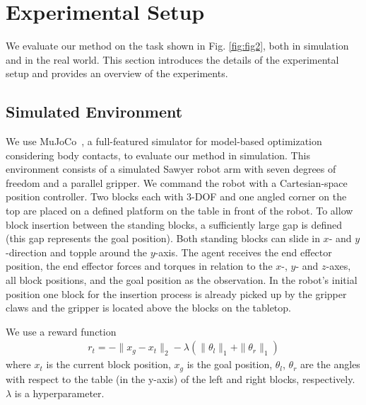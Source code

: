 \section{Experimental Setup}\label{sec:experiments}

We evaluate our method on the task shown in Fig. \ref{fig:fig2}, both in simulation and in the real world. This section introduces the details of the experimental setup and provides an overview of the experiments.

\subsection{Simulated Environment}
We use MuJoCo~\cite{todorov12mujoco}, a full-featured simulator for model-based optimization considering body contacts, to evaluate our method in simulation.
This environment consists of a simulated Sawyer robot arm with seven degrees of freedom and a parallel gripper. 
We command the robot with a Cartesian-space position controller.
Two blocks each with 3-DOF and one angled corner on the top are placed on a defined platform on the table in front of the robot. 
To allow block insertion between the standing blocks, a sufficiently large gap is defined (this gap represents the goal position). 
Both standing blocks can slide in $x$- and $y$-direction and topple around the $y$-axis.
The agent receives the end effector position, the end effector forces and torques in relation to the $x$-, $y$- and $z$-axes, all block positions, and the goal position as the observation. In the robot's initial position one block for the insertion process is already picked up by the gripper claws and the gripper is located above the blocks on the tabletop. 

We use a reward function 
    \begin{align}
        r_t = - \|x_g - x_t \|_2 - \lambda (\|\theta_{l} \|_1 + \|\theta_{r} \|_1)
    \end{align}
where $x_t$ is the current block position, $x_g$ is the goal position, $\theta_{l}$, $\theta_{r}$ are the angles with respect to the table (in the y-axis) of the left and right blocks, respectively. $\lambda$ is a hyperparameter. 


